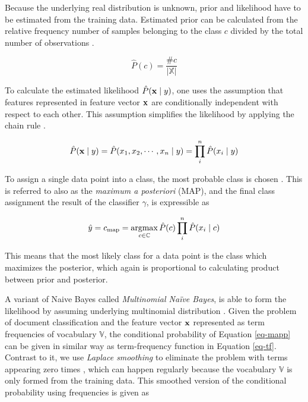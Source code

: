 Because the underlying real distribution is unknown, prior and likelihood have to be estimated from the training data. Estimated prior can be calculated from the relative frequency \ie number of samples belonging to the class $c$ divided by the total number of observations \cite{Manning:2008:IIR:1394399}.

\begin{equation}
    \hat{P}(c) = \frac{\#c}{|\mathbb{X}|}
\end{equation}

\noindent
 To calculate the estimated likelihood $\hat{P}(\mathbf{x} \mid y)$, one uses the assumption that features represented in feature vector $\mathbf{x}$ are conditionally independent with respect to each other. This assumption simplifies the likelihood by applying the chain rule \cite{Manning:2008:IIR:1394399}.

\begin{equation}
    \hat{P}(\mathbf{x} \mid y) = \hat{P}(x_1, x_2, \cdots, x_n \mid y) = \prod \limits_i^n \hat{P}(x_i \mid y)
\end{equation}

To assign a single data point into a class, the most probable class is chosen \cite{Zhang04theoptimality, acemNBtc2001, Manning:2008:IIR:1394399}. This is referred to also as the \emph{maximum a posteriori} (MAP), and the final class assignment \ie the result of the classifier $\gamma$, is expressible as

\begin{equation} \label{eq-mapp}
    \hat{y} = c_{\text{map}} = \operatorname*{argmax} \limits_{c \in \mathbb{C}} \hat{P}(c) \prod \limits_i^n \hat{P}(x_i \mid c)
\end{equation}

\noindent
This means that the most likely class for a data point is the class which maximizes the posterior, which again is proportional to calculating product between prior and posterior.

A variant of Naive Bayes called \emph{Multinomial Naïve Bayes}, is able to form the likelihood by assuming underlying multinomial distribution \cite{acemNBtc2001}. Given the problem of document classification and the feature vector $\mathbf{x}$ represented as term frequencies of vocabulary $\mathbb{V}$, the conditional probability of Equation \ref{eq-mapp} can be given in similar way as term-frequency function in Equation \ref{eq-tf}. Contrast to it, we use \emph{Laplace smoothing} to eliminate the problem with terms appearing zero times \cite{Manning:2008:IIR:1394399}, which can happen regularly because the vocabulary $\mathbb{V}$ is only formed from the training data. This smoothed version of the conditional probability using frequencies is given as \cite{Manning:2008:IIR:1394399}

